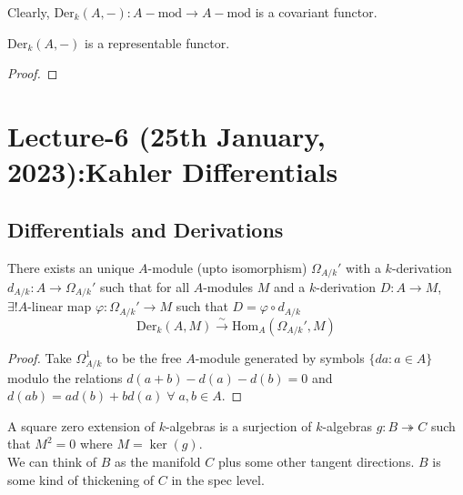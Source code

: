 \documentclass[oneside, 12pt, ]{scrbook}
\newcommand{\Hom}{\mathrm{Hom}}
\theoremstyle{theorem}
\begin{document}
Clearly, $\mathrm{Der}_{k}(A, -): A-\mathrm{mod} \rightarrow A-\mathrm{mod}$ is a covariant functor.

\begin{proposition}
$\mathrm{Der}_{k}(A,-)$ is a representable functor.
\end{proposition}

\begin{proof}

\end{proof}

\chapter{Lecture-6 (25th January, 2023):Kahler Differentials}

\section{Differentials and Derivations}

\begin{theorem}
There exists an unique $A$-module (upto isomorphism) $\Omega_{A/k}'$ with a $k$-derivation $d_{A/k}: A \rightarrow \Omega_{A/k}'$ such that for all $A$-modules $M$ and a $k$-derivation $D: A \rightarrow M$, $\exists ! A$-linear map $\varphi : \Omega_{A/k}' \rightarrow M$ such that $D = \varphi \circ d_{A/k}$ $$\mathrm{Der}_{k}(A,M) \xrightarrow{\sim} \Hom_{A}(\Omega_{A/k}' , M)$$
\end{theorem}

\begin{proof}
Take $\Omega_{A/k}^1$ to be the free $A$-module generated by symbols $\{da: a\in A\}$ modulo the relations $d(a+b) - d(a) - d(b) =0$ and $d(ab) = ad(b) + bd(a) \; \forall \; a,b \in A$.
\end{proof}

\begin{definition}
A square zero extension of $k$-algebras is a surjection of $k$-algebras $g: B \twoheadrightarrow C$ such that $M^2 = 0$ where $M = \ker(g)$. \\
We can think of $B$ as the manifold $C$ plus some other tangent directions. $B$ is some kind of thickening of $C$ in the spec level.
\end{definition}
\end{document}
